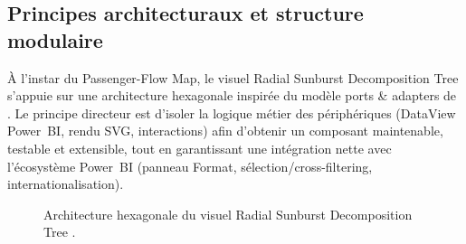 \subsection{Principes architecturaux et structure modulaire}
\label{subsec:4B-architecture}

\setlength{\parindent}{0pt}

À l’instar du Passenger\nobreakdash-Flow Map, le visuel Radial Sunburst Decomposition Tree  s’appuie sur une architecture hexagonale inspirée du modèle ports \& adapters de \parencite{cockburn2008}. Le principe directeur est d’isoler la logique métier des périphériques (DataView Power~BI, rendu SVG, interactions) afin d’obtenir un composant maintenable, testable et extensible, tout en garantissant une intégration nette avec l’écosystème Power~BI (panneau Format, sélection/cross-filtering, internationalisation).

\begin{figure}[H]
  \centering
  \usetikzlibrary{arrows.meta,calc}
  \tikzset{>=Stealth}
  \caption{Architecture hexagonale du visuel Radial Sunburst Decomposition Tree .}
  \label{fig:5B-hexagonal}
\end{figure}

